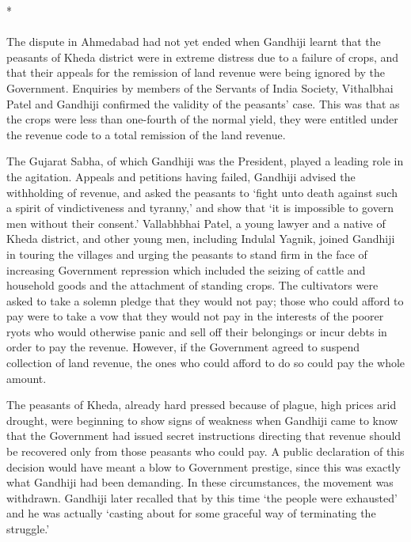 \begin{multicols}{2}
\begin{center}*\end{center}

\paragraph*{}
The dispute in Ahmedabad had not yet ended when Gandhiji learnt that the peasants of Kheda district were in extreme distress due to a failure of crops, and that their appeals for the remission of land revenue were being ignored by the Government. Enquiries by members of the Servants of India Society, Vithalbhai Patel and Gandhiji confirmed the validity of the peasants' case. This was that as the crops were less than one-fourth of the normal yield, they were entitled under the revenue code to a total remission of the land revenue.

The Gujarat Sabha, of which Gandhiji was the President, played a leading role in the agitation. Appeals and petitions having failed, Gandhiji advised the withholding of revenue, and asked the peasants to `fight unto death against such a spirit of vindictiveness and tyranny,' and show that `it is impossible to govern men without their consent.' Vallabhbhai Patel, a young lawyer and a native of Kheda district, and other young men, including Indulal Yagnik, joined Gandhiji in touring the villages and urging the peasants to stand firm in the face of increasing Government repression which included the seizing of cattle and household goods and the attachment of standing crops. The cultivators were asked to take a solemn pledge that they would not pay; those who could afford to pay were to take a vow that they would not pay in the interests of the poorer ryots who would otherwise panic and sell off their belongings or incur debts in order to pay the revenue. However, if the Government agreed to suspend collection of land revenue, the ones who could afford to do so could pay the whole amount.

The peasants of Kheda, already hard pressed because of plague, high prices arid drought, were beginning to show signs of weakness when Gandhiji came to know that the Government had issued secret instructions directing that revenue should be recovered only from those peasants who could pay. A public declaration of this decision would have meant a blow to Government prestige, since this was exactly what Gandhiji had been demanding. In these circumstances, the movement was withdrawn. Gandhiji later recalled that by this time `the people were exhausted' and he was actually `casting about for some graceful way of terminating the struggle.'


\end{multicols}
